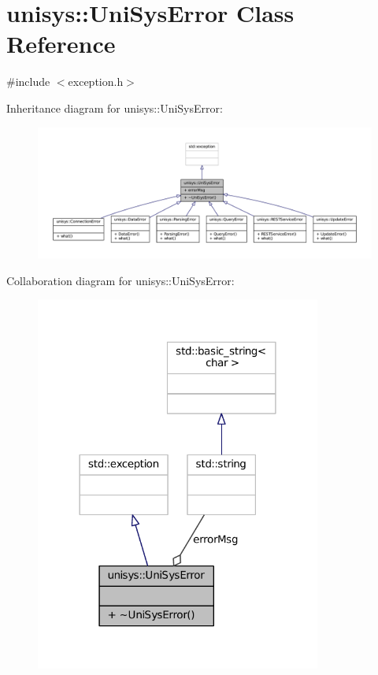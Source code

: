 \hypertarget{classunisys_1_1UniSysError}{\section{unisys\-:\-:Uni\-Sys\-Error Class Reference}
\label{classunisys_1_1UniSysError}
}


{\ttfamily \#include $<$exception.\-h$>$}



Inheritance diagram for unisys\-:\-:Uni\-Sys\-Error\-:
\nopagebreak
\begin{figure}[H]
\begin{center}
\leavevmode
\includegraphics[width=350pt]{classunisys_1_1UniSysError__inherit__graph}
\end{center}
\end{figure}


Collaboration diagram for unisys\-:\-:Uni\-Sys\-Error\-:
\nopagebreak
\begin{figure}[H]
\begin{center}
\leavevmode
\includegraphics[width=266pt]{classunisys_1_1UniSysError__coll__graph}
\end{center}
\end{figure}
